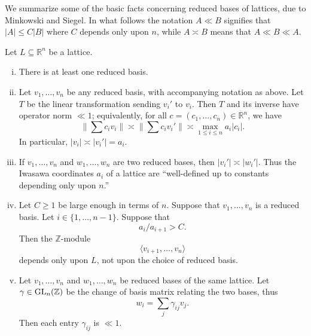 \documentclass[reqno]{amsart} 
\begin{document}
We summarize some of the basic facts concerning reduced bases of lattices, due to Minkowski and Siegel.  In what follows the notation $A \ll B$ signifies that $|A| \leq C |B|$ where $C$ depends only upon $n$, while $A \asymp B$ means that $A \ll B \ll A$.
\begin{theorem}\label{thm:existence-reduced-basis}
  Let $L \subseteq \mathbb{R}^n$ be a lattice.
  \begin{enumerate}
    [(i)]
  \item There is at least one reduced basis.
  \item Let $v_1,\dotsc,v_n$ be any reduced basis, with accompanying notation as above.  Let $T$ be the linear transformation sending $v_i'$ to $v_i$.  Then $T$ and its inverse have operator norm $\ll 1$; equivalently, for all $c = (c_1,\dotsc,c_n) \in \mathbb{R}^n$, we have
    \begin{equation}\label{eqn:reduced-basis-approx-orth}
      \|\sum c_i v_i\| \asymp
      \|\sum c_i v_i'\|
      \asymp \max_{1 \leq i \leq n} a_i |c_i|.
    \end{equation}
    In particular, $|v_i| \asymp |v_i'| = a_i$.
  \item If $v_1,\dotsc,v_n$ and $w_1,\dotsc,w_n$ are two reduced bases, then $|v_i'| \asymp |w_i'|$.  Thus the Iwasawa coordinates $a_i$ of a lattice are ``well-defined up to constants depending only upon $n$.''
  \item Let $C \geq 1$ be large enough in terms of $n$.  Suppose that $v_1,\dotsc,v_n$ is a reduced basis.  Let $i \in \{1, \dotsc, n-1\}$.  Suppose that
    \begin{equation*}
      a_i / a_{i+1} > C.
    \end{equation*}
    Then the $\mathbb{Z}$-module
    \begin{equation*}
      \langle v_{i+1},\dotsc,v_n \rangle
    \end{equation*}
    depends only upon
    $L$, not upon the choice of reduced basis.
  \item \label{item:siegel-finitely-many-gamma} Let $v_1,\dotsc,v_n$ and $w_1,\dotsc,w_n$ be reduced bases of the same lattice.  Let $\gamma \in \operatorname{GL}_n(\mathbb{Z})$ be the change of basis matrix relating the two bases, thus
    \begin{equation*}
      w_i = \sum_{j} \gamma_{i j} v_j.
    \end{equation*}
    Then each entry $\gamma_{i j}$ is $\ll 1$.
  \end{enumerate}
\end{theorem}
\end{document}
